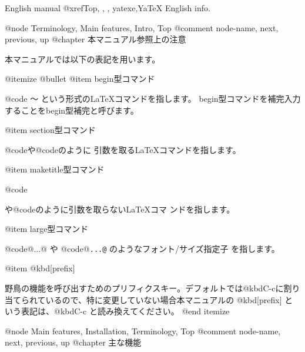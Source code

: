   English manual @xref{Top, , , yatexe,YaTeX English info}.

@node Terminology, Main features, Intro, Top
@comment  node-name,  next,  previous,  up
@chapter 本マニュアル参照上の注意

  本マニュアルでは以下の表記を用います。

@itemize @bullet
@item
begin型コマンド

@code{ 〜 }という形式のLaTeXコマンドを指します。
begin型コマンドを補完入力することをbegin型補完と呼びます。

@item
section型コマンド

@code{}や@code{}のように
引数を取るLaTeXコマンドを指します。

@item
maketitle型コマンド

@code{\maketitle}や@code{\tableofcontents}のように引数を取らないLaTeXコマ
ンドを指します。

@item
large型コマンド

@code{@{\large ...@}} や @code{@{\tt ...@}} のようなフォント/サイズ指定子
を指します。

@item @kbd{[prefix]}

野鳥の機能を呼び出すためのプリフィクスキー。デフォルトでは@kbd{C-c}に割り
当てられているので、特に変更していない場合本マニュアルの @kbd{[prefix]} と
いう表記は、@kbd{C-c} と読み換えてください。
@end itemize

@node Main features, Installation, Terminology, Top
@comment  node-name,  next,  previous,  up
@chapter 主な機能

